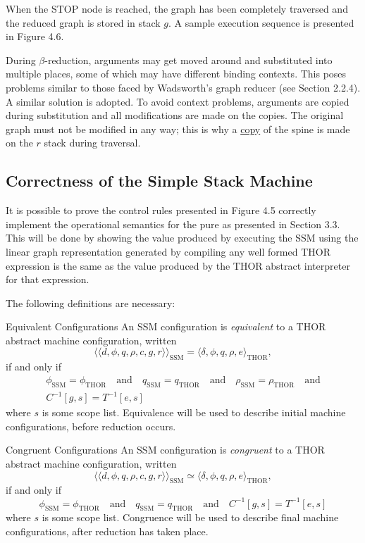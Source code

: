 
When the STOP node is reached, the graph has been completely traversed and the
reduced graph is stored in stack \(g\). A sample execution sequence is presented
in Figure 4.6.

During \(\beta\)-reduction, arguments may get moved around and
substituted into multiple places, some of which may have different binding
contexts. This poses problems similar to those faced by Wadsworth's graph
reducer (see Section 2.2.4). A similar solution is adopted. To avoid context
problems, arguments are copied during substitution and all modifications are made
on the copies. The original graph must not be modified in any way; this is why a
\underline{copy} of the spine is made on the \(r\) stack during traversal.

\subsection{Correctness of the Simple Stack Machine}

It is possible to prove the control rules presented in Figure 4.5 correctly
implement the operational semantics for the pure \lambdacalculus{} as presented
in Section 3.3. This will be done by showing the value produced by executing
the SSM using the linear graph representation generated by compiling any well
formed THOR expression is the same as the value produced by the THOR abstract
interpreter for that expression.

The following definitions are necessary:

\begin{insetdefinition}{Equivalent Configurations}
An SSM configuration is \emph{equivalent} to a THOR abstract machine configuration,
written
\[
\langle\!\langle d,\phi,q,\rho,c,g,r\rangle\!\rangle_{\mathrm{SSM}}
= \langle \delta,\phi,q,\rho,e\rangle_{\mathrm{THOR}},
\]
if and only if
\[
\begin{gathered}
\phi_{\mathrm{SSM}}=\phi_{\mathrm{THOR}}
\quad\text{and}\quad
q_{\mathrm{SSM}}=q_{\mathrm{THOR}}
\quad\text{and}\quad
\rho_{\mathrm{SSM}}=\rho_{\mathrm{THOR}}
\quad\text{and}\\[0.5em]
C^{-1}[g,s]=T^{-1}[e,s]
\end{gathered}
\]
where \(s\) is some scope list. Equivalence will be used to describe initial
machine configurations, before reduction occurs.
\end{insetdefinition}

\begin{insetdefinition}{Congruent Configurations}
An SSM configuration is \emph{congruent} to a THOR abstract machine configuration,
written
\[
\langle\!\langle d,\phi,q,\rho,c,g,r\rangle\!\rangle_{\mathrm{SSM}}
\simeq \langle \delta,\phi,q,\rho,e\rangle_{\mathrm{THOR}},
\]
if and only if
\[
\phi_{\mathrm{SSM}}=\phi_{\mathrm{THOR}}
\quad\text{and}\quad
q_{\mathrm{SSM}}=q_{\mathrm{THOR}}
\quad\text{and}\quad C^{-1}[g,s]=T^{-1}[e,s]
\]
where \(s\) is some scope list. Congruence will be used to describe final
machine configurations, after reduction has taken place.
\end{insetdefinition}

